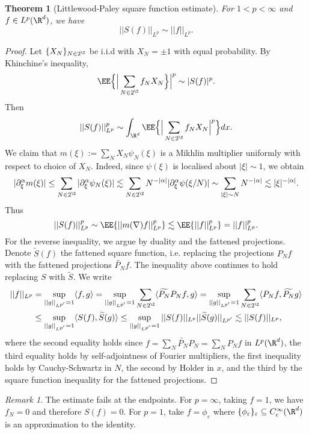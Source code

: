 \documentclass[reqno]{amsart}
\newtheorem{theorem}{Theorem}
\theoremstyle{definition}
\theoremstyle{remark}
\newtheorem*{remark}{Remark}
\renewcommand{\epsilon}{\varepsilon}
\begin{document}
\begin{theorem}[Littlewood-Paley square function estimate]
	For $1 < p < \infty$ and $f \in L^p (\R^d)$, we have
		\[ || S(f)||_{L^p} \sim ||f||_{L^p}. \]\label{thm:square}
\end{theorem}

\begin{proof}
	Let $\{X_N\}_{N \in 2^\Z}$ be i.i.d with $X_N = \pm 1$ with equal probability. By Khinchine's inequality, 
		\[ \EE \Big\{ \Big|\sum_{N \in 2^\Z} f_N X_N \Big\}\Big|^p  \sim |S(f)|^p. \]
	Then 
		\[ ||S(f)||_{L^p}^p \sim \int_{\R^d} \EE \Big\{ \Big|\sum_{N \in 2^\Z} f_N X_N \Big|^p \Big\} dx. \]	
	We claim that $m (\xi) := \sum_N X_N \psi_N (\xi)$ is a Mikhlin multiplier uniformly with respect to choice of $X_N$. Indeed, since $\psi (\xi)$ is localised about $|\xi| \sim 1$, we obtain
		\[ |\partial^\alpha_\xi m (\xi)| \leq \sum_{N \in 2^\Z} |\partial^\alpha_\xi \psi_N (\xi)| \lesssim \sum_{N \in 2^\Z} N^{-|\alpha|} |\partial^\alpha_\xi \psi(\xi/N)| \sim \sum_{|\xi| \sim N} N^{-|\alpha|} \lesssim |\xi|^{-|\alpha|}.  \]
	Thus
		\[ ||S(f)||_{L^p}^p \sim \EE \{ || m(\nabla) f ||_{L^p}^p \}\lesssim \EE \{ ||f||_{L^p}^p \} = ||f||_{L^p}^p. \]	
	For the reverse inequality, we argue by duality and the fattened projections. Denote $\widetilde S(f)$ the fattened square function, i.e. replacing the projections $P_N f$ with the fattened projections $\widetilde{P_N} f$. The inequality above continues to hold replacing $S$ with $\widetilde S$. We write
	\begin{align*}
		||f||_{L^p}
			&= \sup_{||g||_{L^{p'}} = 1} \langle f, g \rangle = \sup_{||g||_{L^{p'}} = 1} \sum_{N \in 2^\Z} \langle \widetilde{P_N} P_N f, g \rangle = \sup_{||g||_{L^{p'}} = 1} \sum_{N \in 2^\Z} \langle  P_N f, \widetilde{P_N} g \rangle \\
			&\leq  \sup_{||g||_{L^{p'}} = 1} \langle S(f), \widetilde{S} (g) \rangle \leq  \sup_{||g||_{L^{p'}} = 1} || S(f) ||_{L^p} ||\widetilde{S}(g)||_{L^{p'}} \lesssim ||S(f)||_{L^p},
	\end{align*}
	where the second equality holds since $f =\sum_N \widetilde{P_N} P_N = \sum_N P_N f$ in $L^p (\R^d)$, the third equality holds by self-adjointness of Fourier multipliers, the first inequality holds by Cauchy-Schwartz in $N$, the second by Holder in $x$, and the third by the square function inequality for the fattened projections. 
\end{proof}	

\begin{remark}
	The estimate fails at the endpoints. For $p = \infty$, taking $f = 1$, we have $f_N = 0$ and therefore $S(f) = 0$. For $p = 1$, take $f = \phi_\epsilon$ where $\{\phi_\epsilon\}_\epsilon \subseteq C^\infty_c (\R^d)$ is an approximation to the identity. 
\end{remark}
\end{document}
